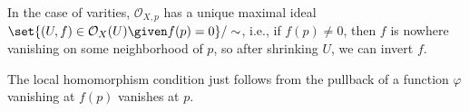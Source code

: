 In the case of varities, $\mathcal{O}_{X, p}$ has a unique maximal ideal
$\set{(U, f) \in \mathcal{O}_X(U)\given f(p) = 0}/\sim$, i.e., if $f(p)\neq 0$,
then $f$ is nowhere vanishing on some neighborhood of $p$, so after shrinking
$U$, we can invert $f$.

The local homomorphism condition just follows from the pullback of a function
$\varphi$ vanishing at $f(p)$ vanishes at $p$.
